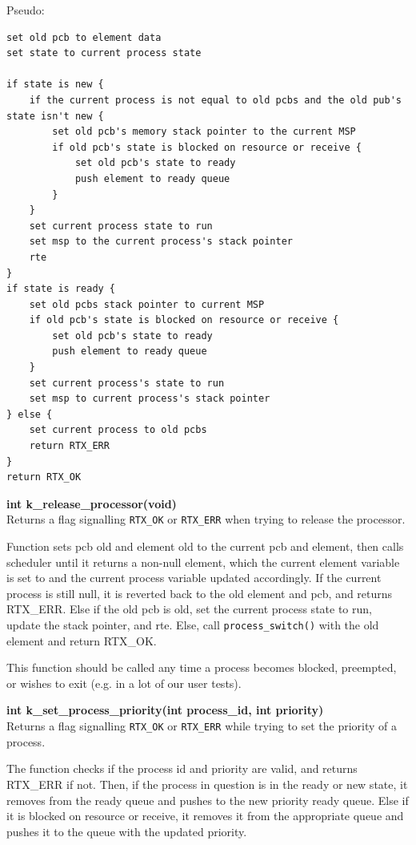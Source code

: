 \documentclass[11pt, oneside]{article}
\begin{document}
Pseudo:
\begin{verbatim}
set old pcb to element data
set state to current process state

if state is new {
    if the current process is not equal to old pcbs and the old pub's state isn't new {
        set old pcb's memory stack pointer to the current MSP
        if old pcb's state is blocked on resource or receive {
            set old pcb's state to ready
            push element to ready queue
        }
    }
    set current process state to run
    set msp to the current process's stack pointer
    rte
}
if state is ready {
    set old pcbs stack pointer to current MSP
    if old pcb's state is blocked on resource or receive {
        set old pcb's state to ready
        push element to ready queue
    }
    set current process's state to run
    set msp to current process's stack pointer
} else {
    set current process to old pcbs
    return RTX_ERR
}
return RTX_OK
\end{verbatim}

{\bf int k\_release\_processor(void)}\\
Returns a flag signalling {\tt RTX\_OK} or {\tt RTX\_ERR} when trying to release the processor.

Function sets pcb old and element old to the current pcb and element, then calls scheduler until it returns a non-null element, which the current element variable is set to and the current process variable updated accordingly.
If the current process is still null, it is reverted back to the old element and pcb, and returns RTX\_ERR.
Else if the old pcb is old, set the current process state to run, update the stack pointer, and rte.
Else, call {\tt process\_switch()} with the old element and return RTX\_OK.

This function should be called any time a process becomes blocked, preempted, or wishes to exit (e.g. in a lot of our user tests).

{\bf int k\_set\_process\_priority(int process\_id, int priority)}\\
Returns a flag signalling {\tt RTX\_OK} or {\tt RTX\_ERR} while trying to set the priority of a process.

The function checks if the process id and priority are valid, and returns RTX\_ERR if not. Then, if the process in question is in the ready or new state, it removes from the ready queue and pushes to the new priority ready queue. Else if it is blocked on resource or receive, it removes it from the appropriate queue and pushes it to the queue with the updated priority.
\end{document}
